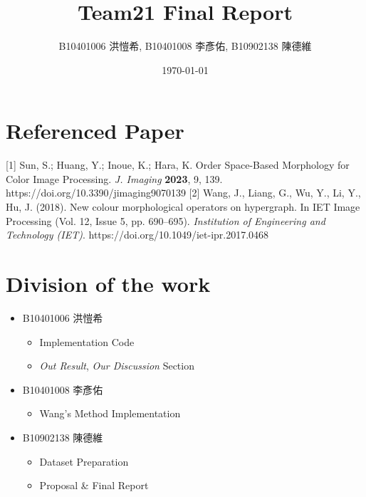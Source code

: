 \documentclass[12pt,a4paper]{article}
\title{Team21 Final Report}
\author{B10401006 洪愷希, B10401008 李彥佑, B10902138 陳德維}   %
\date{\today}   %
\begin{document}
\begin{titlepage}
    \maketitle
    \thispagestyle{empty}
\end{titlepage}

% 



\clearpage



\section*{Referenced Paper}
 [1] Sun, S.; Huang, Y.; Inoue, K.; Hara, K. Order Space-Based Morphology for Color Image Processing. \textit{J. Imaging} \textbf{2023}, 9, 139. https://doi.org/10.3390/jimaging9070139
[2] Wang, J., Liang, G., Wu, Y., Li, Y., Hu, J. (2018). New colour morphological operators on hypergraph. In IET Image Processing (Vol. 12, Issue 5, pp. 690–695). \textit{Institution of Engineering and Technology (IET)}. https://doi.org/10.1049/iet-ipr.2017.0468


\section*{Division of the work}
\begin{itemize}
    \item B10401006 洪愷希
          \begin{itemize}
              \item Implementation Code
              \item \textit{Out Result}, \textit{Our Discussion} Section
          \end{itemize}
    \item B10401008 李彥佑
          \begin{itemize}
              \item Wang's Method Implementation
          \end{itemize}
    \item B10902138 陳德維
          \begin{itemize}
              \item Dataset Preparation
              \item Proposal \& Final Report
          \end{itemize}
\end{itemize}
\end{document}
